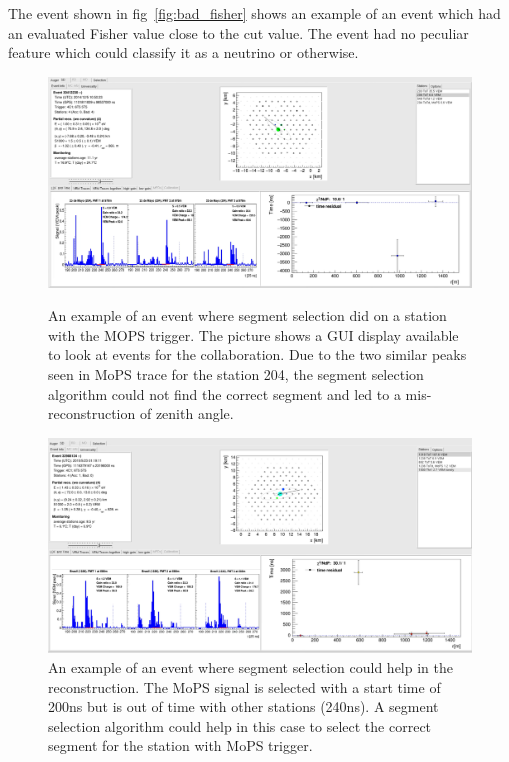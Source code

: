 The event shown in fig~\ref{fig:bad_fisher} shows an example of an event which had an evaluated Fisher value close to the cut value. The event had no peculiar feature which could classify it as a neutrino or otherwise.

\begin{figure}[h!]
  \centering
  \includegraphics[width=\textwidth]{thesis_figures/App3/Bad_segment.pdf}
  \caption{An example of an event where segment selection did on a station with the MOPS trigger. The picture shows a GUI display available to look at events for the collaboration. Due to the two similar peaks seen in MoPS trace for the station 204, the segment selection algorithm could not find the correct segment and led to a mis-reconstruction of zenith angle.}
  \label{fig:bad_segment_selection}
  \includegraphics[width=\textwidth]{thesis_figures/App3/MoPS_peak_selection.pdf}
  \caption{An example of an event where segment selection could help in the reconstruction. The MoPS signal is selected with a start time of 200ns but is out of time with other stations (240ns). A segment selection algorithm could help in this case to select the correct segment for the station with MoPS trigger.}
  \label{fig:good_segment_selection}

\end{figure}

